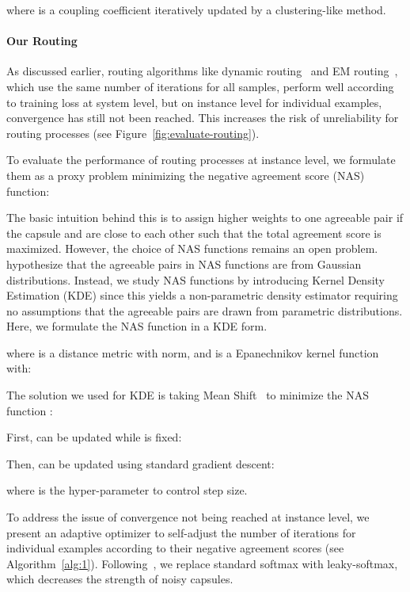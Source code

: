 \documentclass[11pt,a4paper]{article}
\newcommand{\1}{\boldsymbol{1}}
\begin{document}
where  is a coupling coefficient iteratively updated by a clustering-like method.

\paragraph{Our Routing}

As discussed earlier, routing algorithms like dynamic routing~\citep{sabour2017dynamic} and EM routing~\citep{hinton2018matrix}, 
which use the same number of iterations for all samples, 
perform well according to training loss at system level, but on instance level for individual examples, 
convergence has still not been reached. This 
increases 
the risk of 
unreliability 
for routing processes (see Figure~\ref{fig:evaluate-routing}).








To evaluate the performance of routing processes at instance level, we 
formulate them as a proxy problem minimizing 
the negative agreement score (NAS) function:


The basic intuition behind this is to assign 
higher weights  to one agreeable pair  if the capsule  and  are close to each other 
such that the total agreement score  is maximized.
However, the choice of NAS functions remains an open problem.
\citet{hinton2018matrix} hypothesize that the agreeable pairs in NAS functions are from Gaussian distributions. Instead, we study NAS functions by introducing Kernel Density Estimation (KDE) since this yields a 
non-parametric density estimator requiring no
assumptions that the agreeable pairs are drawn from parametric distributions. Here, we formulate the NAS function in a KDE form.

where
 is a distance metric with  norm, and  is a Epanechnikov kernel function~\cite{wand1994kernel} with:
\vspace{-0.05in}





The solution we used for KDE is taking Mean Shift~\cite{comaniciu2002mean} to minimize the NAS function :

First,  can be updated while  is fixed:

Then,  can be updated using standard gradient descent: 

where  is the hyper-parameter to control step size.

To address the issue of convergence not being reached at instance level,
we present an adaptive optimizer to self-adjust the number of iterations for individual examples according to their negative agreement scores
(see Algorithm~\ref{alg:1}).
Following~\citet{zhao2018investigating}, we replace standard softmax with leaky-softmax, which decreases the strength of noisy capsules. 
\end{document}
